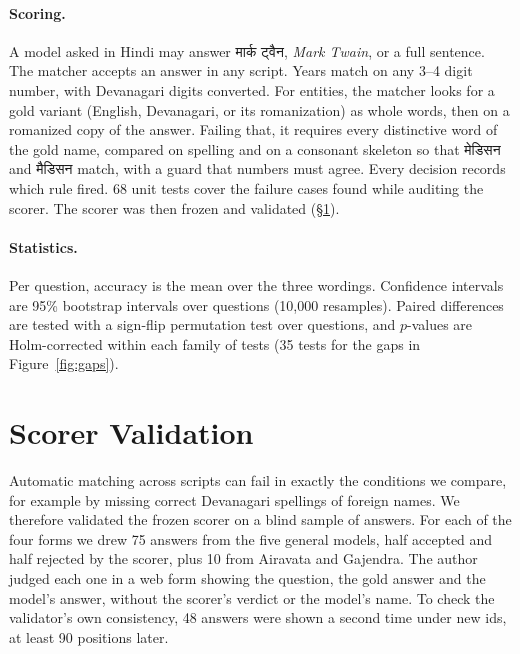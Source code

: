 \documentclass[11pt]{article}
\newcommand{\hi}[1]{{\devfont #1}}
\begin{document}
\paragraph{Scoring.}
A model asked in Hindi may answer \hi{मार्क ट्वैन}, \emph{Mark Twain}, or a full sentence.
The matcher accepts an answer in any script.
Years match on any 3--4 digit number, with Devanagari digits converted.
For entities, the matcher looks for a gold variant (English, Devanagari, or its romanization) as whole words, then on a romanized copy of the answer.
Failing that, it requires every distinctive word of the gold name, compared on spelling and on a consonant skeleton so that \hi{मेडिसन} and \hi{मैडिसन} match, with a guard that numbers must agree.
Every decision records which rule fired.
68 unit tests cover the failure cases found while auditing the scorer.
The scorer was then frozen and validated (\S\ref{sec:validation}).

\paragraph{Statistics.}
Per question, accuracy is the mean over the three wordings.
Confidence intervals are 95\% bootstrap intervals over questions (10{,}000 resamples).
Paired differences are tested with a sign-flip permutation test over questions, and $p$-values are Holm-corrected \citep{holm1979} within each family of tests (35 tests for the gaps in Figure~\ref{fig:gaps}).

\section{Scorer Validation}
\label{sec:validation}

Automatic matching across scripts can fail in exactly the conditions we compare, for example by missing correct Devanagari spellings of foreign names.
We therefore validated the frozen scorer on a blind sample of answers.
For each of the four forms we drew 75 answers from the five general models, half accepted and half rejected by the scorer, plus 10 from Airavata and Gajendra.
The author judged each one in a web form showing the question, the gold answer and the model's answer, without the scorer's verdict or the model's name.
To check the validator's own consistency, 48 answers were shown a second time under new ids, at least 90 positions later.
\end{document}
